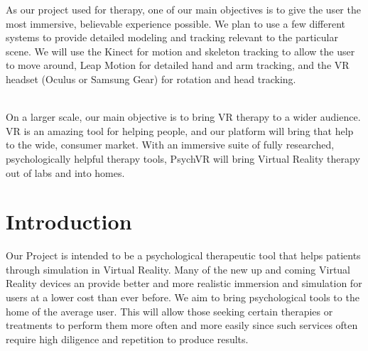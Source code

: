 \documentclass[a4paper,10pt]{article}
\begin{document}
As our project  used for therapy, one of our main objectives is to give the user the most immersive, believable experience possible. We plan to use a few different systems to provide detailed modeling and tracking relevant to the particular scene. We will use the Kinect for motion and skeleton tracking to allow the user to move around, Leap Motion for detailed hand and arm tracking, and the VR headset (Oculus or Samsung Gear) for rotation and head tracking. 
\par ~\\
On a larger scale, our main objective is to bring VR therapy to a wider audience.  VR is an amazing tool for helping people, and our platform will bring that help to the wide, consumer market.  With an immersive suite of fully researched, psychologically helpful therapy tools, PsychVR will bring Virtual Reality therapy out of labs and into homes.

\pagebreak
	\section{Introduction}
	Our Project is intended to be a psychological therapeutic tool that helps patients through simulation in Virtual Reality.	Many of the new up and coming Virtual Reality devices an provide better and more realistic immersion and simulation for users at a lower cost than ever before. We aim to bring psychological tools to the home of the average user. This will allow those seeking certain therapies or treatments to perform them more often and more easily since such services often require high diligence and repetition to produce results.
	
\end{document}
